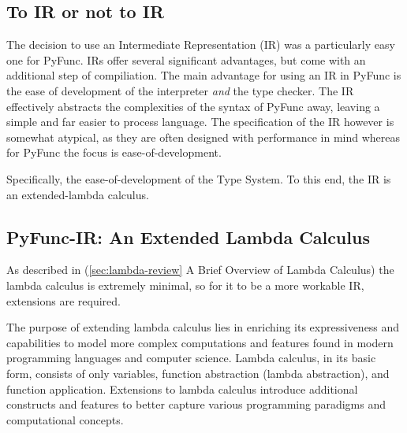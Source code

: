 \documentclass{l4proj}
\begin{document}
\subsection{To IR or not to IR}
The decision to use an Intermediate Representation (IR) was a particularly easy one for PyFunc.
IRs offer several significant advantages, but come with an additional step of compiliation.
The main advantage for using an IR in PyFunc is the ease of development of the interpreter \emph{and} the type checker.
The IR effectively abstracts the complexities of the syntax of PyFunc away, leaving a simple and far easier to process language.
The specification of the IR however is somewhat atypical, as they are often designed with performance in mind whereas for PyFunc the focus is ease-of-development.

Specifically, the ease-of-development of the Type System.
To this end, the IR is an extended-lambda calculus.

\subsection{PyFunc-IR: An Extended Lambda Calculus}
As described in (\ref{sec:lambda-review} A Brief Overview of Lambda Calculus) the lambda calculus is extremely minimal, so for it to be a more workable IR, extensions are required.

The purpose of extending lambda calculus lies in enriching its expressiveness and capabilities to model more complex computations and features found in modern programming languages and computer science.
Lambda calculus, in its basic form, consists of only variables, function abstraction (lambda abstraction), and function application.
Extensions to lambda calculus introduce additional constructs and features to better capture various programming paradigms and computational concepts.
\end{document}
